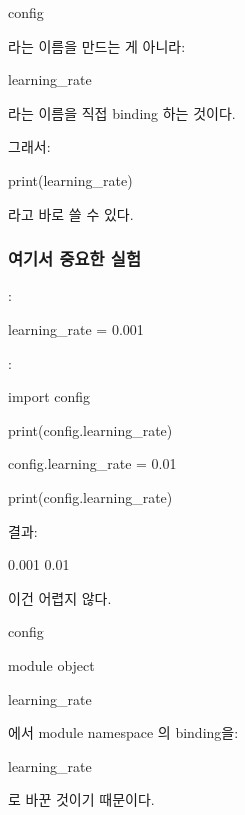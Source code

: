 \begin{dhkzsh}
config
\end{dhkzsh}

라는 이름을 만드는 게 아니라:

\begin{dhkzsh}
learning_rate
\end{dhkzsh}

라는 이름을 직접 binding 하는 것이다.

그래서:

\begin{dhkcode}
print(learning_rate)
\end{dhkcode}

라고 바로 쓸 수 있다.

\subsubsection{여기서 중요한 실험}

:

\begin{dhkcode}
learning_rate = 0.001
\end{dhkcode}

:

\begin{dhkcode}
import config

print(config.learning_rate)

config.learning_rate = 0.01

print(config.learning_rate)
\end{dhkcode}

결과:

\begin{dhkzsh}
0.001
0.01
\end{dhkzsh}

이건 어렵지 않다.

\begin{dhksmry}[centered]
config

\da

module object

\da

learning_rate 
\end{dhksmry}

에서 module namespace 의  binding을:

\begin{dhksmry}[centered]
learning_rate 
\end{dhksmry}

로 바꾼 것이기 때문이다.


